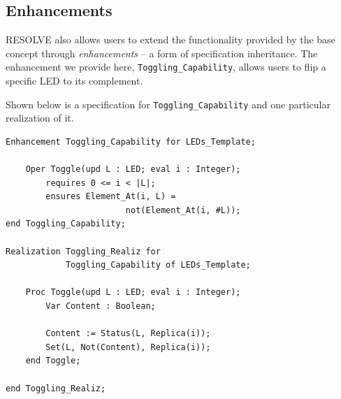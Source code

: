 \documentclass{sig-alternate}
\begin{document}


\subsection{Enhancements}

RESOLVE also allows users to extend the functionality provided by the base concept through \textit{enhancements} -- a form of specification inheritance. The enhancement we provide here, \texttt{Toggling\_Capability}, allows users to flip a specific LED to its complement.

Shown below is a specification for \texttt{Toggling\_Capability} and one particular realization of it.

\begin{verbatim}
Enhancement Toggling_Capability for LEDs_Template;

    Oper Toggle(upd L : LED; eval i : Integer);
        requires 0 <= i < |L|;
        ensures Element_At(i, L) = 
                        not(Element_At(i, #L));
end Toggling_Capability;

Realization Toggling_Realiz for
            Toggling_Capability of LEDs_Template;

    Proc Toggle(upd L : LED; eval i : Integer);
        Var Content : Boolean;
        
        Content := Status(L, Replica(i));
        Set(L, Not(Content), Replica(i));
    end Toggle;
    
end Toggling_Realiz;
\end{verbatim}
\end{document}
